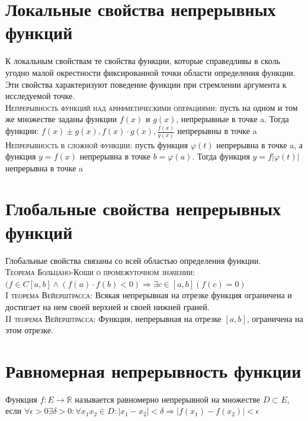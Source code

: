 \documentclass[14pt]{article}
\begin{document}
    \section{Локальные свойства непрерывных функций}
        К локальным свойствам те свойства функции, которые справедливы в сколь угодно малой окрестности фиксированной точки области определения функции. Эти свойства характеризуют поведение функции при стремлении аргумента к исследуемой точке. \\ 
        \textsc{Непрерывность функций над арифметическими операциями:} пусть на одном и том же множестве заданы функции $f(x)$ и $g(x)$, непрерывные в точке a. Тогда функции: $f(x) \pm g(x), f(x) \cdot g(x), \frac{f(x)}{g(x)} $ непрерывны в точке a \\ 
        \textsc{Непрерывность в сложной функции:} пусть функция $\varphi (t) $ непрерывна в точке a, а функция $y = f(x)$ непрерывна в точке $b = \varphi (a)$. Тогда функция $y=f|\varphi(t)|$ непрерывна в точке a

    \section{Глобальные свойства непрерывных функций}
        Глобальные свойства связаны со всей областью определения функции. \\ 
        \textsc{Теорема Больцано-Коши о промежуточном значении:} $(f \in C[a,b] \wedge (f(a) \cdot f(b) < 0) \Rightarrow \exists c \in [a,b] (f(c) = 0)$ \\
        \textsc{I теорема Вейерштрасса:} Всякая непрерывная на отрезке функция ограничена и достигает на нем своей верхней и своей нижней граней.  \\
        \textsc{II теорема Вейерштрасса:} Функция, непрерывная на отрезке $[a,b]$, ограничена на этом отрезке.

    \section{Равномерная непрерывность функции}
        Функция $f:E\rightarrow \mathbb{R}$ называется равномерно непрерывной на множестве $D \subset E$, если $\forall \epsilon > 0 \exists \delta > 0 : \forall x_1 x_2 \in D : |x_1 - x_2 | < \delta \Rightarrow |f(x_1) - f(x_2) | < \epsilon$
\end{document}
